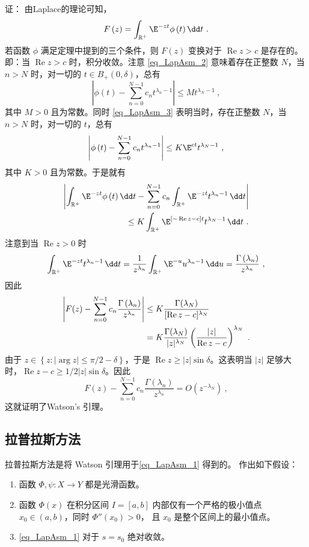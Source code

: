 证：
由Laplace的理论可知， 
\[
F\left(z\right)=\int_{\mathbb{R}^+}{\E^{-zt}\phi\left(t\right)}\,\dd t~.
\]
若函数 $\phi$ 满足定理中提到的三个条件，则 $F(z)$ 变换对于 $\operatorname{Re} z>c$ 是存在的。即：当 $\operatorname{Re} z>c$ 时，积分收敛。注意 \autoref{eq_LapAsm_2} 意味着存在正整数 $N$，当 $n>N$ 时，对一切的 $t\in B_{+}(0,\delta)$，总有
\[
  \left|\phi\left(t\right)-\sum_{n=0}^{N-1}{c_nt^{\lambda_n-1}}\right|\le Mt^{\lambda_N-1}~,
\]
其中 $M>0$ 且为常数。同时 \autoref{eq_LapAsm_3} 表明当时，存在正整数 $N$，当 $n>N$ 时，对一切的 $t$，总有
\[
  \left|\phi\left(t\right)-\sum_{n=0}^{N-1}{c_nt^{\lambda_n-1}}\right|\le K\E^{ct}t^{\lambda_N-1}~,
\]
其中 $K>0$ 且为常数。于是就有
\begin{align*}
  \left|\int_{\mathbb{R}^+}{\E^{-zt}\phi\left(t\right)}\,\dd t-\sum_{n=0}^{N-1}{c_n\int_   {\mathbb{R}^+}{\E^{-zt}t^{\lambda_n-1}}\,\dd t}\right|\\
  \le K\int_{\mathbb{R}^+}\E^{[-\operatorname{Re}z-c]t}t^{\lambda_N-1}\,\dd t~.
\end{align*}
注意到当 $\operatorname{Re}z>0$ 时
\[
  \int_{\mathbb{R}^+}{\E^{-zt}t^{\lambda_n-1}}\,\dd t
  =\frac{1}{z^{\lambda_n}}\int_{\mathbb{R}^+}{\E^{-u}u^{\lambda_n-1}}\,\dd u
  =\frac{\Gamma\left(\lambda_n\right)}{z^{\lambda_n}}~,
\]
因此
\begin{align*}
  \left|F(z)-\sum_{n=0}^{N-1}{c_n\frac{\Gamma\left(\lambda_n\right)}{z^{\lambda_n}}}\right|
  &\le K {\Gamma(\lambda_{N})\over \operatorname{[Re}z-c]^{\lambda_N}}\nonumber\\
  &=K{\Gamma(\lambda_{N})\over |z|^{\lambda_N}}\left(|z|\over \operatorname{Re}z-c\right)^{\lambda_N}\nonumber~.
\end{align*}
由于 $z\in{\left\{z:\left|\arg{z}\right|\le\pi/2-\delta\right\}}$，于是 $\operatorname{Re}z\geq |z|\sin \delta$。这表明当 $\left|z\right|$ 足够大时，$\operatorname{Re}z-c\geqslant1/2|z|\sin \delta$。因此
\[
F\left(z\right)-\sum_{n=0}^{N-1}{c_n\frac{\Gamma\left(\lambda_n\right)}{z^{\lambda_n}}}=O\left(z^{-\lambda_N}\right)~,
\]
这就证明了Watson's 引理。

\subsection{拉普拉斯方法}
拉普拉斯方法是将 Watson 引理用于\autoref{eq_LapAsm_1} 得到的。 作出如下假设：

\begin{enumerate}
  \item 函数 $\Phi,\psi:X\to Y$ 都是光滑函数。
  \item 函数 $\Phi(x)$ 在积分区间 $I=[a,b]$ 内部仅有一个严格的极小值点 $x_0\in(a,b)$，同时 $\Phi''(x_0)>0$， 且 $x_0$ 是整个区间上的最小值点。

  \item \autoref{eq_LapAsm_1} 对于 $s=s_0$ 绝对收敛。
\end{enumerate}


